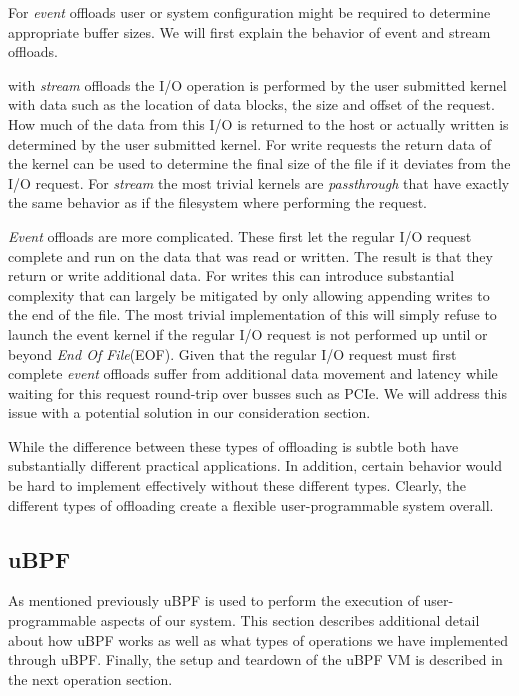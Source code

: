 For \textit{event} offloads user or system configuration might be required to
determine appropriate buffer sizes. We will first explain the behavior of event
and stream offloads.

with \textit{stream} offloads the I/O operation is performed by the user
submitted kernel with data such as the location of data blocks, the size and
offset of the request. How much of the data from this I/O is returned to the
host or actually written is determined by the user submitted kernel. For write
requests the return data of the kernel can be used to determine the final size
of the file if it deviates from the I/O request. For \textit{stream} the most
trivial kernels are \textit{passthrough} that have exactly the same behavior as
if the filesystem where performing the request.

\textit{Event} offloads are more complicated. These first let the regular I/O
request complete and run on the data that was read or written. The result is
that they return or write additional data. For writes this can introduce
substantial complexity that can largely be mitigated by only allowing appending
writes to the end of the file. The most trivial implementation of this will
simply refuse to launch the event kernel if the regular I/O request is not
performed up until or beyond \textit{End Of File}(EOF). Given that the regular
I/O request must first complete \textit{event} offloads suffer from additional
data movement and latency while waiting for this request round-trip over busses
such as PCIe. We will address this issue with a potential solution in our
consideration section.

While the difference between these types of offloading is subtle both have
substantially different practical applications. In addition, certain behavior
would be hard to implement effectively without these different types. Clearly,
the different types of offloading create a flexible user-programmable system
overall.

\subsection{uBPF}
\label{ubpf}

As mentioned previously uBPF \cite{ubpf} is used to perform the execution of
user-programmable aspects of our system. This section describes additional
detail about how uBPF works as well as what types of operations we have
implemented through uBPF. Finally, the setup and teardown of the uBPF VM is
described in the next operation section.

